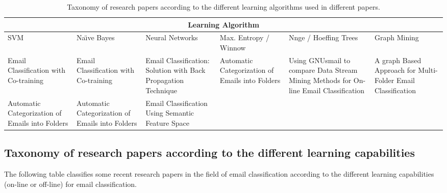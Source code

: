 \begin{center}
  \begin{table}[H]
    \begin{tabular}{|p{2cm}|p{2cm}|p{2cm}|p{2cm}|p{2cm}|p{2cm}|}
      \hline
      \multicolumn{6}{|c|}{Learning Algorithm} \\
      \hline
      SVM & Na\"{\i}ve Bayes & Neural Networks & Max. Entropy / Winnow & Nnge / Hoeffing Trees & Graph Mining \\ \hline
      Email Classification with Co-training \cite{SVETLANA01} &
      Email Classification with Co-training \cite{SVETLANA01} &
      Email Classification: Solution with Back Propagation Technique \cite{mous05} & 
      Automatic Categorization of Emails into Folders \cite{RON04} &
      Using GNUsmail to compare Data Stream Mining Methods for On-line Email Classification \cite{JOSE11} &
      A graph Based Approach for Multi-Folder Email Classification \cite{sift02} \\ \hline

      Automatic Categorization of Emails into Folders \cite{RON04} &
      Automatic Categorization of Emails into Folders \cite{RON04} &
      Email Classification Using Semantic Feature Space \cite{YUN08} & 
      &
      & \\ \hline
    \end{tabular}
    \caption{Taxonomy of research papers according to the different learning algorithms used in different papers.}
  \end{table}
\end{center}

\subsection{Taxonomy of research papers according to the different learning capabilities}
The following table classifies some recent research papers in the field of email 
classification according to the different learning capabilities (on-line or off-line) 
for email classification.

